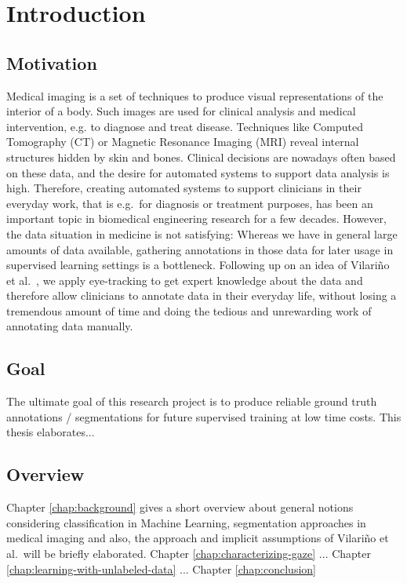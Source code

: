 \chapter{Introduction}
\label{chap:introduction}

\section{Motivation}
      Medical imaging is a set of techniques to produce visual representations of the interior of a body. 
      Such images are used for clinical analysis and medical intervention, e.g. to diagnose and treat disease. 
      Techniques like Computed Tomography (CT) or Magnetic Resonance Imaging (MRI) reveal internal structures hidden by skin and bones. 
      Clinical decisions are nowadays often based on these data, and the desire for automated systems to support data analysis is high. 
      Therefore, creating automated systems to support clinicians in their everyday work, that is e.g.\ for diagnosis or treatment purposes, has been an important topic in biomedical engineering research for a few decades.
      However, the data situation in medicine is not satisfying: 
      Whereas we have in general large amounts of data available, gathering annotations in those data for later usage in supervised learning settings is a bottleneck. 
      Following up on an idea of Vilari\~no et al.\ \cite{vilarino2007automatic}, we apply eye-tracking to get expert knowledge about the data and therefore allow clinicians to annotate data in their everyday life, without losing a tremendous amount of time and doing the tedious and unrewarding work of annotating data manually.
  
\section{Goal}
The ultimate goal of this research project is to produce reliable ground truth annotations / segmentations for future supervised training at low time costs. 
This thesis elaborates... 

\section{Overview}
Chapter \ref{chap:background} gives a short overview about general notions considering classification in Machine Learning, segmentation approaches in medical imaging and also, the approach and implicit assumptions of Vilari\~no et al.\ will be briefly elaborated. Chapter \ref{chap:characterizing-gaze} ... Chapter \ref{chap:learning-with-unlabeled-data} ...  Chapter \ref{chap:conclusion}

